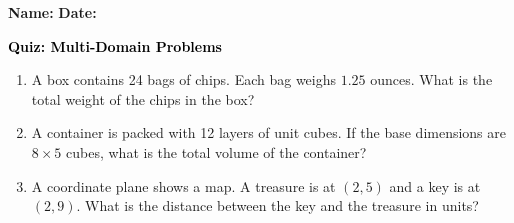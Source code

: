 \documentclass[12pt, letterpaper, fleqn]{article}
\begin{document}
\textbf{Name:} \underline{\hspace{5cm}}
\hfill
\textbf{Date:} \underline{\hspace{3cm}}\\

\begin{tcolorbox}[colback=customteal!20]
    \large\textcolor{black}{\textbf{Quiz: Multi-Domain Problems}}
\end{tcolorbox}
\begin{enumerate}[itemsep=3.5cm, leftmargin=0.6cm]
\item A box contains 24 bags of chips. Each bag weighs $1.25$ ounces. What is the total weight of the chips in the box?
\vspace{3.5cm}
\item A container is packed with 12 layers of unit cubes. If the base dimensions are $8 \times 5$ cubes, what is the total volume of the container?
\vspace{3.5cm}
\item A coordinate plane shows a map. A treasure is at $(2, 5)$ and a key is at $(2, 9)$. What is the distance between the key and the treasure in units?
\end{enumerate}
\end{document}
